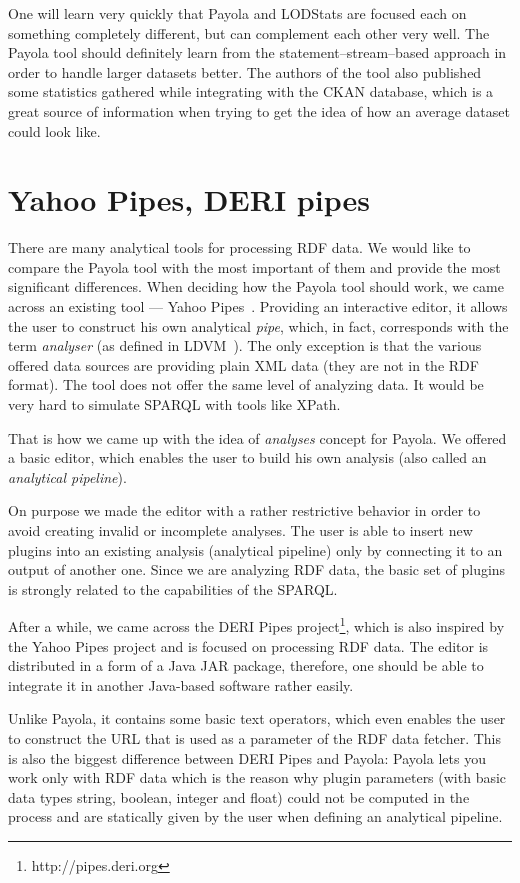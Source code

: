 One will learn very quickly that Payola and LODStats are focused each 
on something completely different, but can complement each other very well. The Payola 
tool should definitely learn from the statement--stream--based approach in order 
to handle larger datasets better. The authors of the tool also published~\cite{lodstats} 
some statistics gathered while integrating with the CKAN database, which is a 
great source of information when trying to get the idea of how an average dataset 
could look like. 

\section{Yahoo Pipes, DERI pipes}
There are many analytical tools for processing RDF data. We would like to 
compare the Payola tool with the most important of them and provide the most significant 
differences. When deciding how the Payola tool should work, we came 
across an existing tool --- Yahoo 
Pipes~\cite{yahoo-pipes}. Providing an interactive 
editor, it allows the user to construct his own analytical \emph{pipe}, 
which, in fact, corresponds with the term \emph{analyser} (as defined in LDVM~\cite{ldvm}).
The only exception is that the various offered data sources are
providing plain XML data (they are not in the RDF format).
The tool does not offer the same level of analyzing data.
It would be very hard to simulate SPARQL with tools like XPath.

That is how we came up with the idea of \emph{analyses} concept for Payola. 
We offered a basic editor, which enables the user to build his own analysis
(also called an \emph{analytical pipeline}).
 
On purpose we made the editor with a rather restrictive behavior in order to 
avoid creating invalid or incomplete analyses. The user is able to insert new 
plugins into an existing analysis (analytical pipeline) only by connecting it to an output of another 
one. Since we are analyzing RDF data, the basic set of plugins is strongly 
related to the capabilities of the SPARQL.

After a while, we came across the DERI Pipes 
project\footnote{http://pipes.deri.org}, which is also inspired by the Yahoo 
Pipes project and is focused on processing RDF data. The editor is distributed 
in a form of a Java JAR package, therefore, one should be able to integrate it in another
Java-based software rather easily.

Unlike Payola, it contains some basic text operators, which even enables the user  
to construct the URL that is used as a parameter of the RDF data fetcher. This 
is also the biggest difference between DERI Pipes and Payola: Payola lets 
you work only with RDF data which is the reason why plugin parameters (with basic data types string,
boolean, integer and float) could not be computed in the process and are 
statically given by the user when defining an analytical pipeline.

